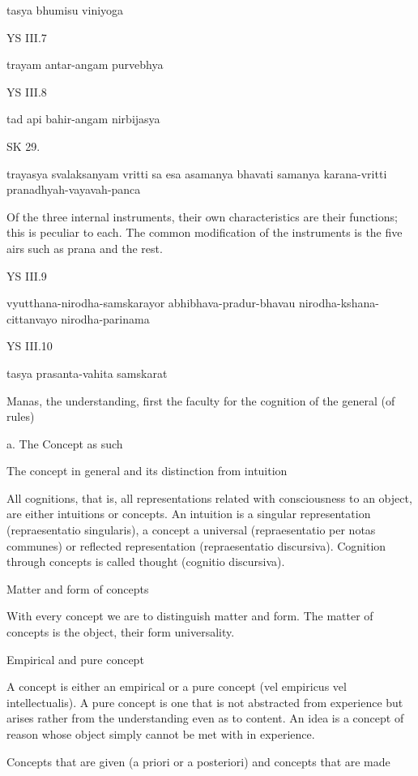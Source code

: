     tasya bhumisu viniyoga

YS III.7

    trayam antar-angam purvebhya

YS III.8

    tad api bahir-angam nirbijasya

SK 29.

trayasya svalaksanyam vritti sa esa asamanya bhavati
samanya karana-vritti pranadhyah-vayavah-panca

Of the three internal instruments, their own characteristics are their functions;
this is peculiar to each.
The common modification of the instruments is the five airs
such as prana and the rest.

YS III.9

    vyutthana-nirodha-samskarayor abhibhava-pradur-bhavau nirodha-kshana-cittanvayo nirodha-parinama

YS III.10

    tasya prasanta-vahita samskarat

    Manas, the understanding, first the faculty for the cognition of the general (of rules)

    a. The Concept as such

    The concept in general and its distinction from intuition

        All cognitions, that is, all representations related with consciousness to an object,
        are either intuitions or concepts.
        An intuition is a singular representation (repraesentatio singularis),
        a concept a universal (repraesentatio per notas communes) or
        reflected representation (repraesentatio discursiva).
        Cognition through concepts is called thought (cognitio discursiva).

    Matter and form of concepts

    With every concept we are to distinguish matter and form.
    The matter of concepts is the object, their form universality.

    Empirical and pure concept

    A concept is either an empirical or a pure concept
    (vel empiricus vel intellectualis).
    A pure concept is one that is not abstracted from experience but
    arises rather from the understanding even as to content.
    An idea is a concept of reason whose object simply cannot be met with in experience.

    Concepts that are given (a priori or a posteriori) and concepts that are made

